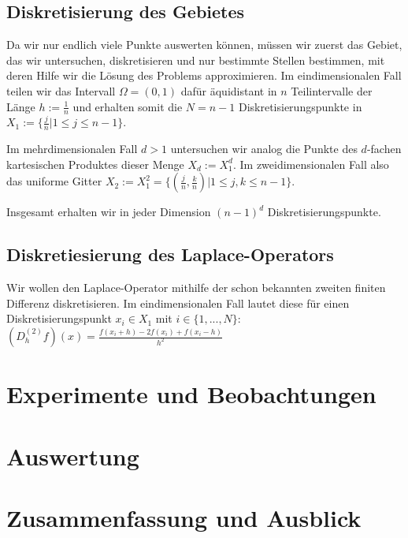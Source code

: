 \documentclass{scrartcl}
\begin{document}
\subsection{Diskretisierung des Gebietes}
Da wir nur endlich viele Punkte auswerten können, müssen wir zuerst das Gebiet, das wir untersuchen, diskretisieren und nur bestimmte Stellen bestimmen, mit deren Hilfe wir die Lösung des Problems approximieren.
Im eindimensionalen Fall teilen wir das Intervall $\Omega=(0,1)$ dafür äquidistant in $n$ Teilintervalle der Länge $h:=\frac{1}{n}$ und erhalten somit die $N=n-1$ Diskretisierungspunkte in
$X_1:=\{\frac{j}{n} | 1\leq j \leq n-1\}$.

Im mehrdimensionalen Fall $d>1$ untersuchen wir analog die Punkte des $d$-fachen kartesischen Produktes dieser Menge $X_d := X_1^d$. Im zweidimensionalen Fall also das uniforme Gitter $X_2 := X_1^2 = \{(\frac{j}{n}, \frac{k}{n}) | 1\leq j,k \leq n-1\}$.

Insgesamt erhalten wir in jeder Dimension $(n-1)^d$ Diskretisierungspunkte.

\subsection{Diskretiesierung des Laplace-Operators}
Wir wollen den Laplace-Operator mithilfe der schon bekannten zweiten finiten Differenz diskretisieren. Im eindimensionalen Fall lautet diese für einen Diskretisierungspunkt $x_i\in X_1$ mit $i \in \{1,...,N\}$:
$(D_h^{(2)}f)(x) = \frac{f(x_i+h) - 2f(x_i)+f(x_i-h)}{h^2}$

\pagebreak
\section{Experimente und Beobachtungen}


\pagebreak
\section{Auswertung}

\pagebreak
\section{Zusammenfassung und Ausblick}

\pagebreak


\end{document}
